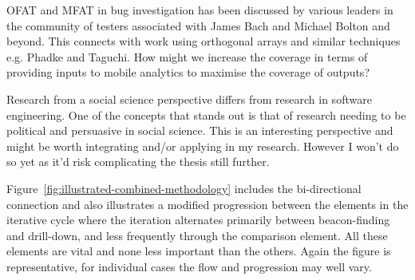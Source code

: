
OFAT and MFAT in bug investigation has been discussed by various leaders in the community of testers associated with James Bach and Michael Bolton and beyond. This connects with work using orthogonal arrays and similar techniques e.g. Phadke and Taguchi. How might we increase the coverage in terms of providing inputs to mobile analytics to maximise the coverage of outputs?



Research from a social science perspective differs from research in software engineering. One of the concepts that stands out is that of research needing to be political and persuasive in social science. This is an interesting perspective and might be worth integrating and/or applying in my research. However I won't do so yet as it'd risk complicating the thesis still further.





Figure~\ref{fig:illustrated-combined-methodology} includes the bi-directional connection and also illustrates a modified progression between the elements in the iterative cycle where the iteration alternates primarily between beacon-finding and drill-down, and less frequently through the comparison element. All these elements are vital and none less important than the others. Again the figure is representative, for individual cases the flow and progression may well vary.


